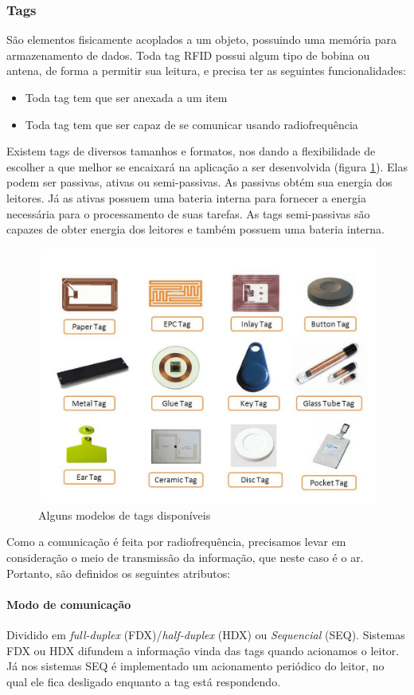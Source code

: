 	\subsubsection{Tags}
	São elementos fisicamente acoplados a um objeto, possuindo uma memória para armazenamento de dados. Toda tag RFID possui algum tipo de bobina ou antena, de forma a permitir sua leitura, e precisa ter as seguintes funcionalidades:
	
		\begin{itemize}
			\item Toda tag tem que ser anexada a um item
			\item Toda tag tem que ser capaz de se comunicar usando radiofrequência
		\end{itemize}
	

	 Existem tags de diversos tamanhos e formatos, nos dando a flexibilidade de escolher a que melhor se encaixará na aplicação a ser desenvolvida (figura \ref{fig:rfidtags}). Elas podem ser passivas, ativas ou semi-passivas. As passivas obtém sua energia dos leitores. Já as ativas possuem uma bateria interna para fornecer a energia necessária para o processamento de suas tarefas.	
	 As tags semi-passivas são capazes de obter energia dos leitores e também possuem uma bateria interna.
	 
		\begin{figure}[h!]
			\centering
			\includegraphics[width=0.5\linewidth]{rfidtagas}
			\caption{Alguns modelos de tags disponíveis}
			\label{fig:rfidtags}
		\end{figure}
	
	Como a comunicação é feita por radiofrequência, precisamos levar em consideração o meio de transmissão da informação, que neste caso é o ar. Portanto, são definidos os seguintes atributos:   
	
	\paragraph{Modo de comunicação} Dividido em \textit{full-duplex} (FDX)/\textit{half-duplex} (HDX) ou \textit{Sequencial} (SEQ). Sistemas FDX ou HDX difundem a informação vinda das tags quando acionamos o leitor. Já nos sistemas SEQ é implementado um acionamento periódico do leitor, no qual ele fica desligado enquanto a tag está respondendo.	
